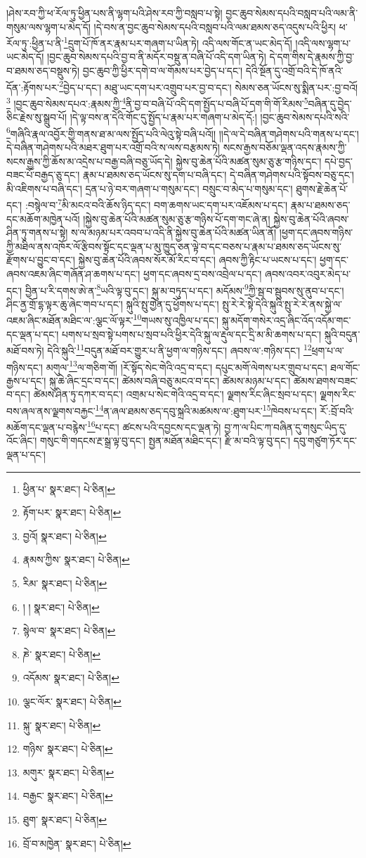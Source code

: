 །ཤེས་རབ་ཀྱི་ཕ་རོལ་ཏུ་ཕྱིན་པས་ནི་ལྷག་པའི་ཤེས་རབ་ཀྱི་བསླབ་པ་སྟེ། བྱང་ཆུབ་སེམས་དཔའི་བསླབ་པའི་ལམ་ནི་གསུམ་ལས་ལྷག་པ་མེད་དོ། །དེ་བས་ན་བྱང་ཆུབ་སེམས་དཔའི་བསླབ་པའི་ལམ་ཐམས་ཅད་འདུས་པའི་ཕྱིར། ཕ་རོལ་ཏུ་:ཕྱིན་པ་ནི་\footnote{ཕྱིན་པ་  སྣར་ཐང་།  པེ་ཅིན། }དྲུག་པོ་ཁོ་ནར་རྣམ་པར་གཞག་པ་ཡིན་ཏེ། འདི་ལས་གོང་ན་ཡང་མེད་དོ། །འདི་ལས་ལྷག་པ་ཡང་མེད་དོ། །བྱང་ཆུབ་སེམས་དཔའི་བྱ་བ་ནི་མདོར་བསྡུ་ན་བཞི་པོ་འདི་དག་ཡིན་ཏེ། དེ་དག་གིས་དེ་རྣམས་ཀྱི་བྱ་བ་ཐམས་ཅད་བསྡུས་ཏེ། བྱང་ཆུབ་ཀྱི་ཕྱིར་དགེ་བ་ལ་གོམས་པར་བྱེད་པ་དང་། དེའི་སྔོན་དུ་འགྲོ་བའི་དེ་ཁོ་ནའི་དོན་:རྟོགས་པར་\footnote{རྟོག་པར་  སྣར་ཐང་།  པེ་ཅིན། }བྱེད་པ་དང་། མཐུ་ཡང་དག་པར་འགྲུབ་པར་བྱ་བ་དང་། སེམས་ཅན་ཡོངས་སུ་སྨིན་པར་:བྱ་བའོ།\footnote{བྱའོ།  སྣར་ཐང་།  པེ་ཅིན། } །བྱང་ཆུབ་སེམས་དཔའ་:རྣམས་ཀྱི་\footnote{རྣམས་ཀྱིས་  སྣར་ཐང་།  པེ་ཅིན། }ནི་བྱ་བ་བཞི་པོ་འདི་དག་སྤྱོད་པ་བཞི་པོ་དག་གི་གོ་རིམས་\footnote{རིམ་  སྣར་ཐང་།  པེ་ཅིན། }བཞིན་དུ་བྱེད་ཅིང་རྗེས་སུ་སྒྲུབ་པོ། །དེ་ལྟ་བས་ན་དེའི་གོང་དུ་སྤྱོད་པ་རྣམ་པར་གཞག་པ་མེད་དོ:། །བྱང་ཆུབ་སེམས་དཔའི་སའི་\footnote{། །  སྣར་ཐང་།  པེ་ཅིན། }གཞིའི་རྣལ་འབྱོར་གྱི་གནས་ཐ་མ་ལས་སྤྱོད་པའི་ལེའུ་སྟེ་བཞི་པའོ།། །།དེ་ལ་དེ་བཞིན་གཤེགས་པའི་གནས་པ་དང་། དེ་བཞིན་གཤེགས་པའི་མཐར་ཐུག་པར་འགྲོ་བའི་ས་ལས་བརྩམས་ཏེ། སངས་རྒྱས་བཅོམ་ལྡན་འདས་རྣམས་ཀྱི་སངས་རྒྱས་ཀྱི་ཆོས་མ་འདྲེས་པ་བརྒྱ་བཞི་བཅུ་ཡོད་དེ། སྐྱེས་བུ་ཆེན་པོའི་མཚན་སུམ་ཅུ་རྩ་གཉིས་དང་། དཔེ་བྱད་བཟང་པོ་བརྒྱད་ཅུ་དང་། རྣམ་པ་ཐམས་ཅད་ཡོངས་སུ་དག་པ་བཞི་དང་། དེ་བཞིན་གཤེགས་པའི་སྟོབས་བཅུ་དང་། མི་འཇིགས་པ་བཞི་དང་། དྲན་པ་ཉེ་བར་གཞག་པ་གསུམ་དང་། བསྲུང་བ་མེད་པ་གསུམ་དང་། ཐུགས་རྗེ་ཆེན་པོ་དང་། :བསྙེལ་བ་\footnote{སྙེལ་བ་  སྣར་ཐང་།  པེ་ཅིན། }མི་མངའ་བའི་ཆོས་ཉིད་དང་། བག་ཆགས་ཡང་དག་པར་འཇོམས་པ་དང་། རྣམ་པ་ཐམས་ཅད་དང་མཆོག་མཁྱེན་པའོ། །སྐྱེས་བུ་ཆེན་པོའི་མཚན་སུམ་ཅུ་རྩ་གཉིས་པོ་དག་གང་ཞེ་ན། སྐྱེས་བུ་ཆེན་པོའི་ཞབས་ཤིན་ཏུ་གནས་པ་སྟེ། ས་ལ་མཉམ་པར་འབབ་པ་འདི་ནི་སྐྱེས་བུ་ཆེན་པོའི་མཚན་ཡིན་ནོ། །ཕྱག་དང་ཞབས་གཉིས་ཀྱི་མཐིལ་ནས་འཁོར་ལོ་རྩིབས་སྟོང་དང་ལྡན་པ་མུ་ཁྱུད་ཅན་ལྟེ་བ་དང་བཅས་པ་རྣམ་པ་ཐམས་ཅད་ཡོངས་སུ་རྫོགས་པ་བྱུང་བ་དང་། སྐྱེས་བུ་ཆེན་པོའི་ཞབས་སོར་མོ་རིང་བ་དང་། ཞབས་ཀྱི་རྟིང་པ་ཡངས་པ་དང་། ཕྱག་དང་ཞབས་འཇམ་ཞིང་གཞོན་ཤ་ཆགས་པ་དང་། ཕྱག་དང་ཞབས་དྲ་བས་འབྲེལ་པ་དང་། ཞབས་འབར་འབུར་མེད་པ་དང་། བྱིན་པ་རི་དགས་ཨེ་ན་\footnote{ཎེ་  སྣར་ཐང་།  པེ་ཅིན། }ཡའི་ལྟ་བུ་དང་། སྐུ་མ་བཏུད་པ་དང་། མདོམས་\footnote{འདོམས་  སྣར་ཐང་།  པེ་ཅིན། }ཀྱི་སྦ་བ་སྦུབས་སུ་ནུབ་པ་དང་། ཤིང་ནྱ་གྲོ་དྷ་ལྟར་ཆུ་ཞེང་གབ་པ་དང་། སྐུའི་སྤུ་གྱེན་དུ་ཕྱོགས་པ་དང་། སྤུ་རེ་རེ་སྟེ་དེའི་སྐུའི་སྤུ་རེ་རེ་ནས་སྐྱེ་ལ་འཇམ་ཞིང་མཐོན་མཐིང་ལ་:ལྕང་ལོ་ལྟར་\footnote{ལྕང་ལོར་  སྣར་ཐང་།  པེ་ཅིན། }གཡས་སུ་འཁྱིལ་པ་དང་། སྐུ་མདོག་གསེར་འདྲ་ཞིང་འོད་འདོམ་གང་དང་ལྡན་པ་དང་། པགས་པ་སྲབ་སྟེ་པགས་པ་སྲབ་པའི་ཕྱིར་དེའི་སྐུ་ལ་རྡུལ་དང་དྲི་མ་མི་ཆགས་པ་དང་། སྐུའི་བདུན་མཐོ་བས་ཏེ། དེའི་སྐུའི་\footnote{སྐུ་  སྣར་ཐང་།  པེ་ཅིན། }བདུན་མཐོ་བར་གྱུར་པ་ནི་ཕྱག་ལ་གཉིས་དང་། ཞབས་ལ་:གཉིས་དང་། \footnote{གཉིས་  སྣར་ཐང་།  པེ་ཅིན། }ཕྲག་པ་ལ་གཉིས་དང་། མགུལ་\footnote{མགུར་  སྣར་ཐང་།  པེ་ཅིན། }ལ་གཅིག་གོ། །རོ་སྟོད་སེང་གེའི་འདྲ་བ་དང་། དཔུང་མགོ་ལེགས་པར་གྲུབ་པ་དང་། ཐལ་གོང་རྒྱས་པ་དང་། སྐུ་ཆེ་ཞིང་དྲང་བ་དང་། ཚེམས་བཞི་བཅུ་མངའ་བ་དང་། ཚེམས་མཉམ་པ་དང་། ཚེམས་ཐགས་བཟང་བ་དང་། ཚེམས་ཤིན་ཏུ་དཀར་བ་དང་། འགྲམ་པ་སེང་གེའི་འདྲ་བ་དང་། ལྗགས་རིང་ཞིང་སྲབ་པ་དང་། ལྗགས་རིང་བས་ཞལ་ནས་ལྗགས་བརྐྱང་\footnote{བརྒྱང་  སྣར་ཐང་།  པེ་ཅིན། }ན་ཞལ་ཐམས་ཅད་དབུ་སྐྲའི་མཚམས་ལ་:ཐུག་པར་\footnote{ཐུག་  སྣར་ཐང་།  པེ་ཅིན། }ཁེབས་པ་དང་། རོ་:བྲོ་བའི་མཆོག་དང་ལྡན་པ་བརྙེས་\footnote{བྲོ་བ་མཁྱེན་  སྣར་ཐང་།  པེ་ཅིན། }པ་དང་། ཚངས་པའི་དབྱངས་དང་ལྡན་ཏེ། བྱ་ཀ་ལ་པིང་ཀ་བཞིན་དུ་གསུང་ཡིད་དུ་འོང་ཞིང་། གསུང་གི་གདངས་རྔ་སྒྲ་ལྟ་བུ་དང་། སྤྱན་མཐོན་མཐིང་དང་། རྫི་མ་བའི་ལྟ་བུ་དང་། དབུ་གཙུག་ཏོར་དང་ལྡན་པ་དང་། 